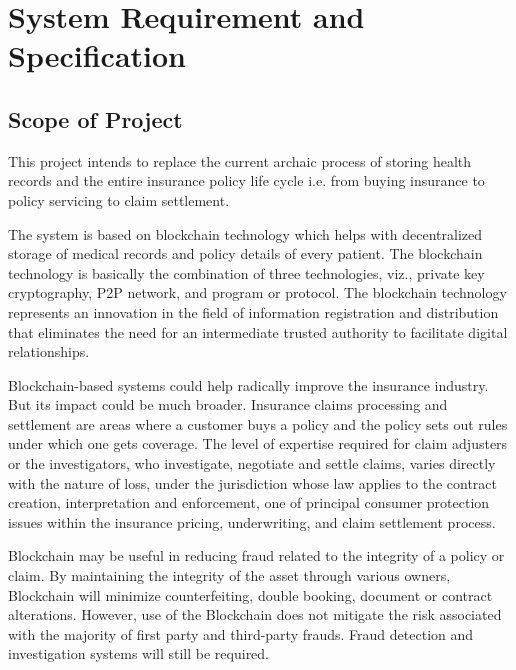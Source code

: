 \chapter{System Requirement and Specification }

\section{Scope of Project}
This project intends to replace the current archaic process of storing health records and the entire insurance policy life cycle i.e. from buying insurance to policy servicing to claim settlement.

The system is based on blockchain technology which helps with decentralized storage of medical records and policy details of every patient. The blockchain technology is basically the combination of three technologies, viz., private key cryptography, P2P network, and program or protocol. The blockchain technology represents an innovation in the field of information registration and distribution that eliminates the need for an intermediate trusted authority to facilitate digital relationships.
        
Blockchain-based systems could help radically improve the insurance industry. But its impact could be much broader. Insurance claims processing and settlement are areas where a customer buys a policy and the policy sets out rules under which one gets coverage. The level of expertise required for claim adjusters or the investigators, who investigate, negotiate and settle claims, varies directly with the nature of loss, under the jurisdiction whose law applies to the contract creation, interpretation and enforcement, one of principal consumer protection issues within the insurance pricing, underwriting, and claim settlement process.
         
Blockchain may be useful in reducing fraud related to the integrity of a policy or claim. By maintaining the integrity of the asset through various owners, Blockchain will minimize counterfeiting, double booking, document or contract alterations. However, use of the Blockchain does not mitigate the risk associated with the majority of first party and third-party frauds. Fraud detection and investigation systems will still be required.
